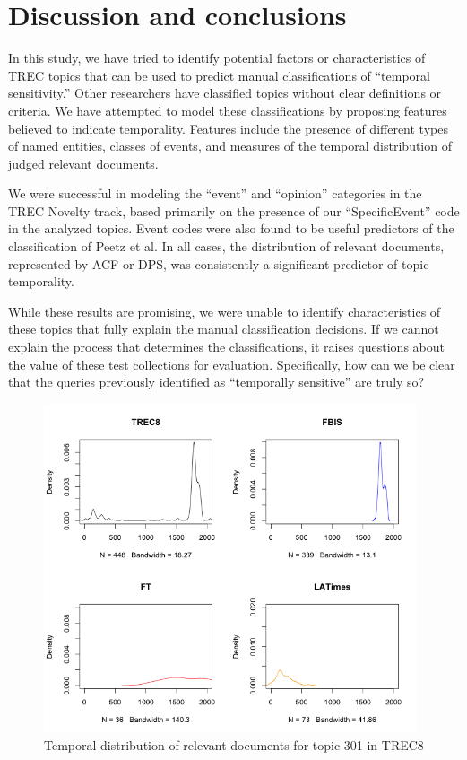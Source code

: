 \documentclass[runningheads,a4paper]{llncs}
\begin{document}
\section{Discussion and conclusions}

In this study, we have tried to identify potential factors or characteristics of TREC topics that can be used to predict manual classifications of ``temporal sensitivity.'' Other researchers have classified topics without clear definitions or criteria. We have attempted to model these classifications by proposing features believed to indicate temporality.  Features include the presence of different types of named entities, classes of events, and measures of the temporal distribution of judged relevant documents.

We were successful in modeling the ``event'' and ``opinion'' categories in the TREC Novelty track, based primarily on the presence of our ``SpecificEvent'' code in the analyzed topics.  Event codes were also found to be useful predictors of the classification of Peetz et al. In all cases, the distribution of relevant documents, represented by ACF or DPS, was consistently a significant predictor of topic temporality. 

While these results are promising, we were unable to identify characteristics of these topics that fully explain the manual classification decisions. If we cannot explain the process that determines the classifications, it raises questions about the value of these test collections for evaluation. Specifically, how can we be clear that the queries previously identified as ``temporally sensitive'' are truly so? 

\begin{figure}
\includegraphics[width=11cm]{images/301.png}
\caption{Temporal distribution of relevant documents for topic 301 in TREC8} 
\label{fig.301}
\end{figure}
\end{document}

